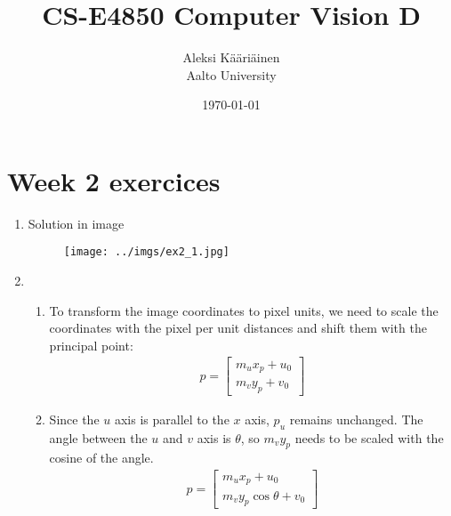 \documentclass[11pt,a4paper]{article}
\title{CS-E4850 Computer Vision D}
\author{Aleksi Kääriäinen  \\
	Aalto University  \\
	}
\begin{document}
\date{\today}

\maketitle

\newpage

\section*{Week 2 exercices}

\begin{enumerate}

    \item Solution in image

          \begin{figure}[H]
              \centering
              \texttt{[image: ../imgs/ex2\_1.jpg]}
          \end{figure}

          \newpage

    \item

          \begin{enumerate}

              \item To transform the image coordinates to pixel units, we need to scale the coordinates with the
                    pixel per unit distances and shift them with the principal point:
                    \begin{align*}
                        p = \begin{bmatrix}
                                m_u x_p + u_0 \\
                                m_v y_p + v_0
                            \end{bmatrix}
                    \end{align*}

              \item Since the $u$ axis is parallel to the $x$ axis, $p_u$ remains unchanged. The angle between
                    the $u$ and $v$ axis is $\theta$, so $m_v y_p$ needs to be scaled with the cosine of the angle.
                    \begin{align*}
                        p = \begin{bmatrix}
                                m_u x_p + u_0 \\
                                m_v y_p \cos{\theta} + v_0
                            \end{bmatrix}
                    \end{align*}


\end{enumerate}
\end{enumerate}
\end{document}
